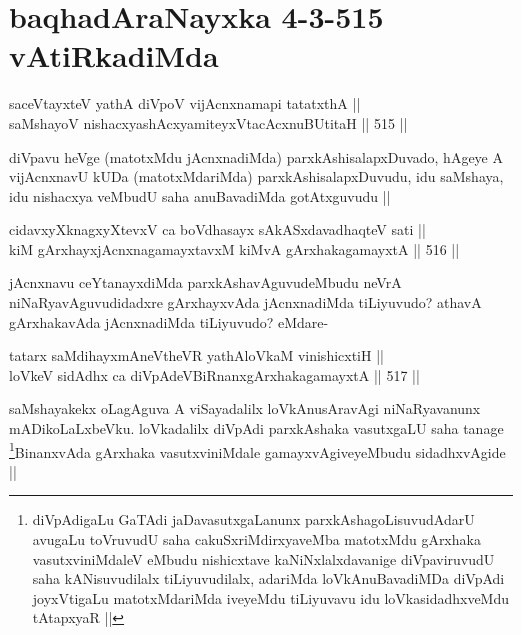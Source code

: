 \section*{baqhadAraNayxka 4-3-515 vAtiRkadiMda}

\begin{shl}
saceVtayxteV yathA diVpoV vijAcnxnamapi tatatxthA || \\
saMshayoV nishacxyashAcxyamiteyxVtacAcxnuBUtitaH ||  515 ||  
\end{shl}

\begin{artha}
diVpavu heVge (matotxMdu jAcnxnadiMda) parxkAshisalapxDuvado, hAgeye A vijAcnxnavU kUDa (matotxMdariMda) parxkAshisalapxDuvudu, idu saMshaya, idu nishacxya veMbudU saha anuBavadiMda gotAtxguvudu ||
\end{artha}


\begin{shl}
cidavxyXknagxyXtevxV ca boVdhasayx sAkASxdavadhaqteV sati || \\
kiM gArxhayxjAcnxnagamayxtavxM kiMvA gArxhakagamayxtA ||  516 ||  
\end{shl}

\begin{artha}
jAcnxnavu ceYtanayxdiMda parxkAshavAguvudeMbudu neVrA niNaRyavAguvudidadxre gArxhayxvAda jAcnxnadiMda tiLiyuvudo? athavA gArxhakavAda jAcnxnadiMda tiLiyuvudo? eMdare-
\end{artha}

\begin{shl}
tatarx saMdihayxmAneV\s theVR yathAloVkaM vinishicxtiH || \\
loVkeV sidAdhx ca diVpAdeVBiRnanxgArxhakagamayxtA ||  517 ||  
\end{shl}

\begin{artha}
saMshayakekx oLagAguva A viSayadalilx loVkAnusAravAgi niNaRyavanunx mADikoLaLxbeVku. loVkadalilx diVpAdi parxkAshaka vasutxgaLU saha tanage \footnote{diVpAdigaLu GaTAdi jaDavasutxgaLanunx parxkAshagoLisuvudAdarU avugaLu toVruvudU saha cakuSxriMdirxyaveMba matotxMdu gArxhaka vasutxviniMdaleV eMbudu nishicxtave kaNiNxlalxdavanige diVpaviruvudU saha kANisuvudilalx tiLiyuvudilalx, adariMda loVkAnuBavadiMDa diVpAdi joyxVtigaLu matotxMdariMda iveyeMdu tiLiyuvavu idu loVkasidadhxveMdu tAtapxyaR ||}BinanxvAda gArxhaka vasutxviniMdale gamayxvAgiveyeMbudu sidadhxvAgide ||
\end{artha}

